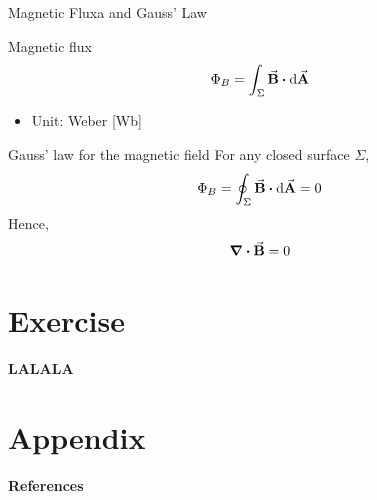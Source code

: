 \documentclass{beamer}
\begin{document}
\begin{frame}{Magnetic Fluxa and Gauss' Law}
    \begin{block}{Magnetic flux}
        \begin{equation}
            \Phi_B = \int_\Sigma \va{B} \vdot \dd{\va{A}}
        \end{equation}
    \end{block}
    \begin{itemize}
        \item Unit: Weber [Wb]
    \end{itemize}
    \vfill
    \begin{block}{Gauss' law for the magnetic field}
        For any closed surface $\Sigma$,
        \begin{equation}
            \Phi_B = \oint_\Sigma \va{B} \vdot \dd{\va{A}} = 0
        \end{equation}
        Hence,
        \begin{equation}
            \div{\va{B}} = 0
        \end{equation}
    \end{block}
\end{frame}




\section{Exercise}



\begin{frame}
    \begin{center}
        \LARGE\bf LALALA
    \end{center}
	
\end{frame}


\section{Appendix}


\begin{frame}{\bf References}
	\nocite{*} %
	
	
\end{frame}
\end{document}
